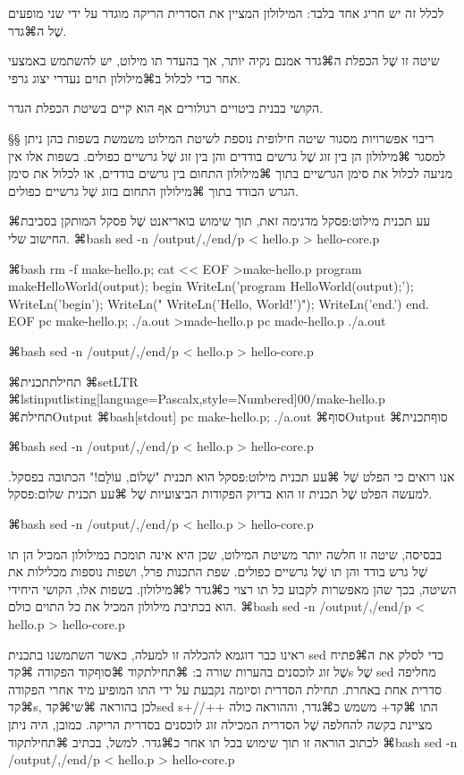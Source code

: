 לכלל זה יש חריג אחד בלבד:
המילולון המציין את הסדרית הריקה מוגדר על ידי שני מופעים שֶׁל ה⌘גדר.

שיטה זו שֶׁל הכפלת ה⌘גדר אמנם נקיה יותר, אך בהעדר תו מילוט, יש
להשתמש באמצעי אחר כדי לכלול ב⌘מילולון תוים נעדרי יצוג גרפי.

הקושי בבנית ביטויים רגולורים אף הוא קיים בשיטת הכפלת הגדר.

§§ ריבוי אפשרויות מסגור
שיטה חילופית נוספת לשיטת המילוט משמשת בשפות בהן ניתן למסגר ⌘מילולון הן בין זוג
שֶׁל גרשים בודדים והן בין זוג שֶׁל גרשיים כפולים. בשפות אלו אין מניעה לכלול את
סימן הגרשיים בתוך ⌘מילולון התחום בין גרשים בודדים, או לכלול את סימן הגרש הבודד
בתוך ⌘מילולון התחום בזוג שֶׁל גרשיים כפולים.

⌘עע תכנית מילוט:פסקל מדגימה זאת, תוך שימוש בואריאנט שֶׁל פסקל המותקן בסביבת
החישוב שלי.
⌘bash
sed -n /output/,/end/p < hello.p > hello-core.p
\END

⌘bash
rm -f make-hello.p; cat << EOF >make-hello.p
program makeHelloWorld(output);
begin
  WriteLn('program HelloWorld(output);');
  WriteLn('begin');
  WriteLn(" WriteLn('Hello, World!')");
  WriteLn('end.')
end.
EOF
pc make-hello.p; ./a.out >made-hello.p
pc made-hello.p
./a.out
\END

⌘bash
sed -n /output/,/end/p < hello.p > hello-core.p
\END

⌘תחילת{תכנית}
⌘setLTR
⌘lstinputlisting[language=Pascalx,style=Numbered]{00/make-hello.p}
⌘תחילת{Output}
⌘bash[stdout]
pc make-hello.p; ./a.out
\END
⌘סוף{Output}\setRTL
{}
⌘סוף{תכנית}

⌘bash
sed -n /output/,/end/p < hello.p > hello-core.p
\END

אנו רואים כי הפלט שֶׁל ⌘עע תכנית מילוט:פסקל הוא תכנית "שָׁלוֹם, עוֹלָם!" הכתובה
בפסקל. למעשה הפלט שֶׁל תכנית זו הוא בדיוק הפקודות הביצועיות שֶׁל ⌘עע תכנית
שלום:פסקל.

⌘bash
sed -n /output/,/end/p < hello.p > hello-core.p
\END

בבסיסה, שיטה זו חלשה יותר משיטת המילוט, שכן היא אינה תומכת במילולון המכיל הן
תו שֶׁל גרש בודד והן תו שֶׁל גרשיים כפולים. שפת התכנות פרל, ושפות נוספות מכלילות
את השיטה, בכך שהן מאפשרות לקבוע כל תו רצוי כ⌘גדר ל⌘מילולון. בשפות אלו, הקושי
היחידי הוא בכתיבת מילולון המכיל את כל התוים כולם.
⌘bash
sed -n /output/,/end/p < hello.p > hello-core.p
\END

ראינו כבר דוגמא להכללה זו למעלה, כאשר השתמשנו בתכנית sed כדי לסלק
את ה⌘פתיח שֶׁל זוג לוכסנים בהערות שורה ב:
⌘תחילת{קוד}
⌘סוף{קוד}
הפקודה ⌘קד{s} שֶׁל sed מחליפה סדרית אחת באחרת. תחילת הסדרית וסיומה נקבעת על
ידי התו המופיע מיד אחרי הפקודה ⌘קד{s}, לכן בהוראה ⌘שי{⌘קד{sed s+//++}} התו
⌘קד{+} משמש כ⌘גדר, וההוראה כולה מציינת בקשה להחלפה שֶׁל הסדרית המכילה זוג
לוכסנים בסדרית הריקה. כמובן, היה ניתן לכתוב הוראה זו תוך שימוש בכל תו אחר
כ⌘גדר. למשל, בכתיב
⌘תחילת{קוד}
⌘bash
sed -n /output/,/end/p < hello.p > hello-core.p
\END

